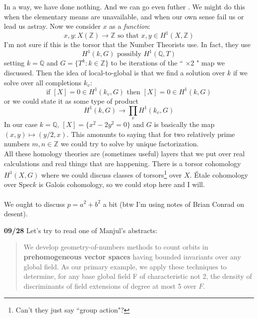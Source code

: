 \documentclass[12pt]{article}
\begin{document}
In a way, we have done nothing.  And we can go even futher .  We might do this when the elementary means are unavailable, and when our own sense fail us or lead us astray.  Now we consider $x$ as a \textit{function}:
$$ x, y : X(\mathbb{Z}) \to \mathbb{Z} \text{ so that } x, y \in H^1(X, \mathbb{Z})$$
I'm not sure if this is the torsor that the Number Theorists use.  In fact, they use 
$$ H^1(k, G) \text{ possibly } H^1(\mathbb{Q}, T) $$
setting $k = \mathbb{Q}$ and $G = \{ T^k: k \in \mathbb{Z}\}$ to be iterations of the `` $\times$2 " map we discussed.  Then the idea of local-to-global is that we find a solution over $k$ if we solve over all completions $k_v$:
$$ \text{if }[X]= 0 \in H^1(k_v, G) \text{ then }[X]=0 \in H^1(k, G) $$
or we could state it as some type of product
$$ H^1(k, G) \to \prod_v H^1(k_v, G) $$
In our case $k = \mathbb{Q}$, $[X] = \{  x^2 - 2y^2 = 0\}$ and $G $ is basically the map $(x,y) \mapsto (y/2, x)$.  This amonunts to saying that for two relatively prime numbers $m, n \in \mathbb{Z}$ we could try to solve by unique factorization.
$$  $$
All these homology theories are (sometimes useful) layers that we put over real calculations and real things that are happening.  There is a torsor cohomology $H^1(X, G)$ where we could discuss classes of torsors\footnote{Can't they just say ``group action"?} over $X$. \'{E}tale cohomology over $\mathrm{Spec} k$ is Galois cohomology, so we could stop here and I will. \\ \\
We ought to discuss $p = a^2 + b^2$ a bit (btw I'm using notes of Brian Conrad on desent).

\newpage

\noindent \textbf{09/28} Let's try to read one of Manjul's abstracts:
\begin{quotation}
We develop {\color{blue!50!gray}geometry-of-numbers} methods to count orbits in \textbf{prehomogeneous vector spaces}
having bounded invariants over any global field. As our primary example, we apply these techniques to determine, for any base global field F of characteristic not 2, the {\color{red!50!gray}density of discriminants} of field extensions of degree at most 5 over $F$.
\end{quotation}
\end{document}
